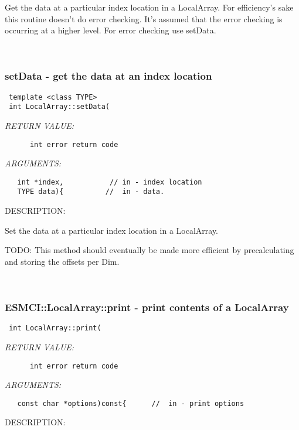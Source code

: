     Get the data at a particular index location in a LocalArray. For
    efficiency's sake this routine doesn't do error checking. It's assumed 
    that the error checking is occurring at a higher level. For error checking
    use setData.
   
 
\mbox{}\hrulefill\
 
\subsubsection [setData] {setData - get the data at an index location}


  
\begin{verbatim} template <class TYPE>
 int LocalArray::setData(\end{verbatim}{\em RETURN VALUE:}
\begin{verbatim}      int error return code\end{verbatim}{\em ARGUMENTS:}
\begin{verbatim}   int *index,           // in - index location
   TYPE data){          //  in - data. \end{verbatim}
{\sf DESCRIPTION:\\ }


    Set the data at a particular index location in a LocalArray. 
  
   TODO: This method should eventually be made more efficient by precalculating
          and storing the offsets per Dim. 
   
 
\mbox{}\hrulefill\
 
\subsubsection [ESMCI::LocalArray::print] {ESMCI::LocalArray::print - print contents of a LocalArray}


  
\begin{verbatim} int LocalArray::print(\end{verbatim}{\em RETURN VALUE:}
\begin{verbatim}      int error return code\end{verbatim}{\em ARGUMENTS:}
\begin{verbatim}   const char *options)const{      //  in - print options\end{verbatim}
{\sf DESCRIPTION:\\ }



